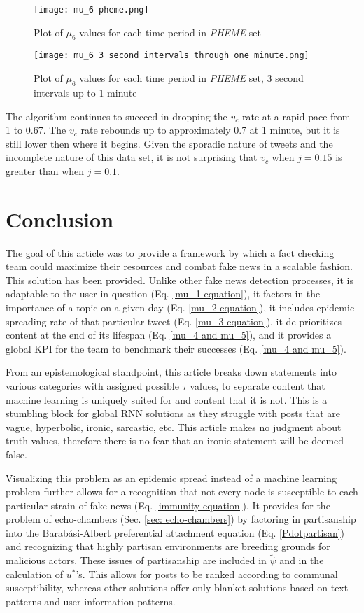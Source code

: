 \documentclass[preprint,review,12pt]{elsarticle}
\begin{document}
\begin{figure}[h]
\centering
{}
  \texttt{[image: mu\_6 pheme.png]}
      \caption{Plot of $\mu_6$ values for each time period in \textit{PHEME} set}
    \label{fig:mu6 PHEME}
\endminipage\hfill
{}
  \texttt{[image: mu\_6 3 second intervals through one minute.png]}
    \caption{Plot of $\mu_6$ values for each time period in \textit{PHEME} set, 3 second intervals up to 1 minute}
    \label{fig:mu6 PHEME 3s}
\endminipage
\end{figure}

The algorithm continues to succeed in dropping the $v_c$ rate at a rapid pace from 1 to 0.67. The $v_c$ rate rebounds up to approximately 0.7 at 1 minute, but it is still lower then where it begins. Given the sporadic nature of tweets and the incomplete nature of this data set, it is not surprising that $v_c$ when $j=0.15$ is greater than when $j = 0.1$. 

\section{Conclusion}
The goal of this article was to provide a framework by which a fact checking team could maximize their resources and combat fake news in a scalable fashion. This solution has been provided. Unlike other fake news detection processes, it is adaptable to the user in question (Eq. \ref{mu_1 equation}), it factors in the importance of a topic on a given day (Eq. \ref{mu_2 equation}), it includes epidemic spreading rate of that particular tweet (Eq. \ref{mu_3 equation}), it de-prioritizes content at the end of its lifespan (Eq. \ref{mu_4 and mu_5}), and it provides a global KPI for the team to benchmark their successes (Eq. \ref{mu_4 and mu_5}).

From an epistemological standpoint, this article breaks down statements into various categories with assigned possible $\tau$ values, to separate content that machine learning is uniquely suited for and content that it is not. This is a stumbling block for global RNN solutions as they struggle with posts that are vague, hyperbolic, ironic, sarcastic, etc. This article makes no judgment about truth values, therefore there is no fear that an ironic statement will be deemed false. 

Visualizing this problem as an epidemic spread instead of a machine learning problem further allows for a recognition that not every node is susceptible to each particular strain of fake news (Eq. \ref{immunity equation}). It provides for the problem of echo-chambers (Sec. \ref{sec: echo-chambers}) by factoring in partisanship into the Barab{\'a}si-Albert preferential attachment equation (Eq. \ref{Pdotpartisan}) and recognizing that highly partisan environments are breeding grounds for malicious actors. These issues of partisanship are included in $\tilde{\psi}$ and in the calculation of $u^*$'s. This allows for posts to be ranked according to communal susceptibility, whereas other solutions offer only blanket solutions based on text patterns and user information patterns. 
\end{document}
